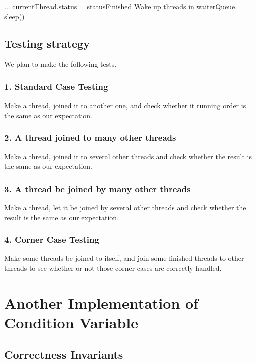 \documentclass{article}
\begin{document}
	\begin{algorithm}[H]
		\begin{algorithmic}
				\State ...
				\State currentThread.status = statusFinished
				\State Wake up threads in waiterQueue.
				\State sleep()
			\EndProcedure
		\end{algorithmic}
	\end{algorithm}
	
	
	\subsection{Testing strategy}
	
	We plan to make the following tests.
	\subsubsection*{1. Standard Case Testing}
	Make a thread, joined it to another one, and check whether it running order is the same as our expectation.
	
	\subsubsection*{2. A thread joined to many other threads}
	Make a thread, joined it to several other threads and check whether the result is the same as our expectation.
	
	\subsubsection*{3. A thread be joined by many other threads}
	Make a thread, let it be joined by several other threads and check whether the result is the same as our expectation.
	
	\subsubsection*{4. Corner Case Testing}
	Make some threads be joined to itself, and join some finished threads to other threads to see whether or not those corner cases are correctly handled.
	
	\section{Another Implementation of Condition Variable}
	
	\subsection{Correctness Invariants}
	
\end{document}
